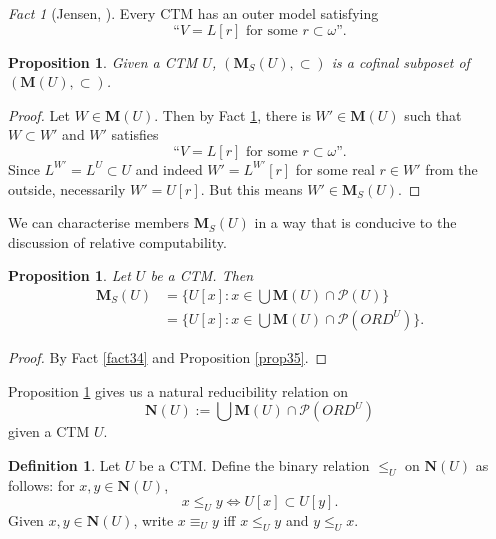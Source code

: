 \documentclass[12pt, twoside]{memoir}
\numberwithin{equation}{section}
\newtheorem{prop}[thm]{Proposition}
\theoremstyle{definition}
\newtheorem{defi}[thm]{Definition}
\theoremstyle{remark}
\newtheorem{fact}[thm]{Fact}
\theoremstyle{definition}
\theoremstyle{definition}
\theoremstyle{definition}
\theoremstyle{remark}
\begin{document}
\begin{fact}[Jensen, \cite{jensencoding}]\label{fact37}
Every CTM has an outer model satisfying 
\begin{equation*}
    \text{``} V = L[r] \text{ for some } r \subset \omega \text{''.}
\end{equation*}
\end{fact}

\begin{prop}
Given a CTM $U$, $(\mathbf{M}_{S}(U), \subset)$ is a cofinal subposet of $(\mathbf{M}(U), \subset)$.
\end{prop}

\begin{proof}
Let $W \in \mathbf{M}(U)$. Then by Fact \ref{fact37}, there is $W' \in \mathbf{M}(U)$ such that $W \subset W'$ and $W'$ satisfies
\begin{equation*}
    \text{``} V = L[r] \text{ for some } r \subset \omega \text{''.}
\end{equation*}
Since $L^{W'} = L^U \subset U$ and indeed $W' = L^{W'}[r]$ for some real $r \in W'$ from the outside, necessarily $W' = U[r]$. But this means $W' \in \mathbf{M}_{S}(U)$.
\end{proof}

We can characterise members $\mathbf{M}_{S}(U)$ in a way that is conducive to the discussion of relative computability.

\begin{prop}\label{prop37}
Let $U$ be a CTM. Then
\begin{align*}
    \mathbf{M}_{S}(U) & = \{U[x] : x \in \bigcup \mathbf{M}(U) \cap \mathcal{P}(U)\} \\
    & = \{U[x] : x \in \bigcup \mathbf{M}(U) \cap \mathcal{P}(ORD^U)\} \text{.}
\end{align*}
\end{prop}

\begin{proof}
By Fact \ref{fact34} and Proposition \ref{prop35}.
\end{proof}

Proposition \ref{prop37} gives us a natural reducibility relation on 
\begin{equation*}
    \mathbf{N}(U) := \bigcup \mathbf{M}(U) \cap \mathcal{P}(ORD^U)
\end{equation*}
given a CTM $U$. 

\begin{defi}\label{def9111}
Let $U$ be a CTM. Define the binary relation $\leq_U$ on $\mathbf{N}(U)$ as follows: for $x, y \in \mathbf{N}(U)$,
\begin{equation*}
    x \leq_U y \iff U[x] \subset U[y] \text{.}
\end{equation*}
Given $x, y \in \mathbf{N}(U)$, write $x \equiv_U y$ iff $x \leq_U y$ and $y \leq_U x$.
\end{defi}
\end{document}
